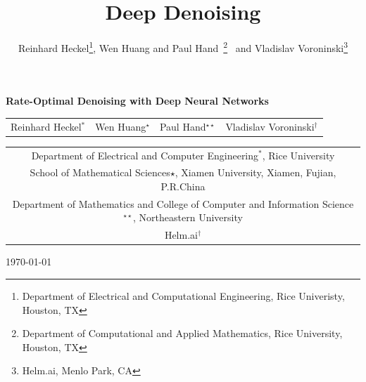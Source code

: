 \documentclass[11pt]{article}
\title{Deep Denoising}
\author{ Reinhard Heckel\thanks{Department of Electrical and Computational Engineering, Rice Univeristy, Houston, TX}, Wen Huang and Paul Hand\ \thanks{Department of Computational and Applied Mathematics, Rice University, Houston, TX} \  and Vladislav Voroninski\thanks{Helm.ai, Menlo Park, CA}}
\begin{document}

\begin{center}

{\bf{\LARGE{
Rate-Optimal Denoising with Deep Neural Networks
}}}

\vspace*{.2in}

{\large{
\begin{tabular}{cccc}
Reinhard Heckel$^{\ast}$ & Wen Huang$^{\star}$ & Paul Hand$^{\star\star}$ & Vladislav Voroninski$^{\dagger}$\\
\end{tabular}
}}

\vspace*{.05in}

\begin{tabular}{c}
Department of Electrical and Computer Engineering$^\ast$, Rice University \\
School of Mathematical Sciences$\star$, 
Xiamen University, Xiamen, Fujian, P.R.China\\ %
Department of Mathematics and College of Computer and Information Science$^{\star\star}$, Northeastern University\\
Helm.ai$^\dagger$%
\end{tabular}


\vspace*{.1in}


\today

\vspace*{.1in}

\end{center}
\end{document}
